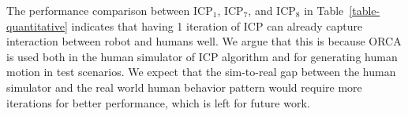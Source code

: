 The performance comparison between ICP$_1$, ICP$_7$, and ICP$_8$ in Table~\ref{table-quantitative} indicates that having 1 iteration of ICP can already capture interaction between robot and humans well. We argue that this is because ORCA is used both in the human simulator of ICP algorithm and for generating human motion in test scenarios. We expect that the sim-to-real gap between the human simulator and the real world human behavior pattern would require more iterations for better performance, which is left for future work.